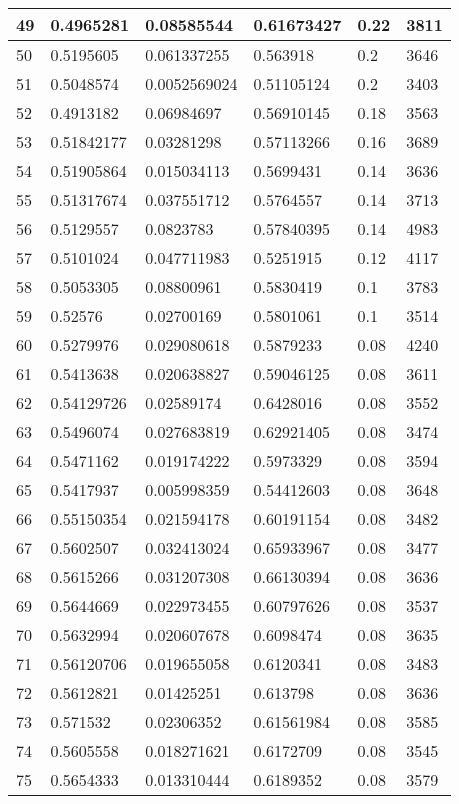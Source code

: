 \begin{longtable}{|l|l|l|l|l|l|}
49 & 0.4965281 & 0.08585544 & 0.61673427 & 0.22 & 3811 \\ \hline 
50 & 0.5195605 & 0.061337255 & 0.563918 & 0.2 & 3646 \\ \hline 
51 & 0.5048574 & 0.0052569024 & 0.51105124 & 0.2 & 3403 \\ \hline 
52 & 0.4913182 & 0.06984697 & 0.56910145 & 0.18 & 3563 \\ \hline 
53 & 0.51842177 & 0.03281298 & 0.57113266 & 0.16 & 3689 \\ \hline 
54 & 0.51905864 & 0.015034113 & 0.5699431 & 0.14 & 3636 \\ \hline 
55 & 0.51317674 & 0.037551712 & 0.5764557 & 0.14 & 3713 \\ \hline 
56 & 0.5129557 & 0.0823783 & 0.57840395 & 0.14 & 4983 \\ \hline 
57 & 0.5101024 & 0.047711983 & 0.5251915 & 0.12 & 4117 \\ \hline 
58 & 0.5053305 & 0.08800961 & 0.5830419 & 0.1 & 3783 \\ \hline 
59 & 0.52576 & 0.02700169 & 0.5801061 & 0.1 & 3514 \\ \hline 
60 & 0.5279976 & 0.029080618 & 0.5879233 & 0.08 & 4240 \\ \hline 
61 & 0.5413638 & 0.020638827 & 0.59046125 & 0.08 & 3611 \\ \hline 
62 & 0.54129726 & 0.02589174 & 0.6428016 & 0.08 & 3552 \\ \hline 
63 & 0.5496074 & 0.027683819 & 0.62921405 & 0.08 & 3474 \\ \hline 
64 & 0.5471162 & 0.019174222 & 0.5973329 & 0.08 & 3594 \\ \hline 
65 & 0.5417937 & 0.005998359 & 0.54412603 & 0.08 & 3648 \\ \hline 
66 & 0.55150354 & 0.021594178 & 0.60191154 & 0.08 & 3482 \\ \hline 
67 & 0.5602507 & 0.032413024 & 0.65933967 & 0.08 & 3477 \\ \hline 
68 & 0.5615266 & 0.031207308 & 0.66130394 & 0.08 & 3636 \\ \hline 
69 & 0.5644669 & 0.022973455 & 0.60797626 & 0.08 & 3537 \\ \hline 
70 & 0.5632994 & 0.020607678 & 0.6098474 & 0.08 & 3635 \\ \hline 
71 & 0.56120706 & 0.019655058 & 0.6120341 & 0.08 & 3483 \\ \hline 
72 & 0.5612821 & 0.01425251 & 0.613798 & 0.08 & 3636 \\ \hline 
73 & 0.571532 & 0.02306352 & 0.61561984 & 0.08 & 3585 \\ \hline 
74 & 0.5605558 & 0.018271621 & 0.6172709 & 0.08 & 3545 \\ \hline 
75 & 0.5654333 & 0.013310444 & 0.6189352 & 0.08 & 3579 \\ \hline 
\end{longtable}